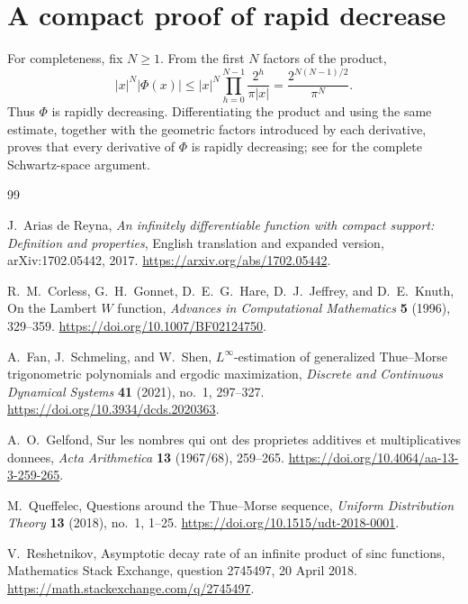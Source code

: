 \documentclass[11pt,oneside]{article}
\theoremstyle{definition}
\theoremstyle{remark}
\newcommand{\PhiF}{\Phi}
\begin{document}
\section{A compact proof of rapid decrease}
\label{app:rapid}

For completeness, fix \(N\ge1\).  From the first \(N\) factors of the product,
\[
 |x|^N|\PhiF(x)|
 \le |x|^N\prod_{h=0}^{N-1}
 \frac{2^h}{\pi|x|}
 =\frac{2^{N(N-1)/2}}{\pi^N}.
\]
Thus \(\PhiF\) is rapidly decreasing.  Differentiating the product and using
the same estimate, together with the geometric factors introduced by each
derivative, proves that every derivative of \(\PhiF\) is rapidly decreasing;
see \cite{arias2017} for the complete Schwartz-space argument.

\begin{thebibliography}{99}

J.~Arias de Reyna,
\newblock \emph{An infinitely differentiable function with compact support:
Definition and properties},
\newblock English translation and expanded version, arXiv:1702.05442, 2017.
\newblock \url{https://arxiv.org/abs/1702.05442}.

R.~M.~Corless, G.~H.~Gonnet, D.~E.~G.~Hare, D.~J.~Jeffrey, and D.~E.~Knuth,
\newblock On the Lambert \(W\) function,
\newblock \emph{Advances in Computational Mathematics} \textbf{5} (1996),
329--359.
\newblock \url{https://doi.org/10.1007/BF02124750}.

A.~Fan, J.~Schmeling, and W.~Shen,
\newblock \(L^\infty\)-estimation of generalized Thue--Morse trigonometric
polynomials and ergodic maximization,
\newblock \emph{Discrete and Continuous Dynamical Systems} \textbf{41}
(2021), no.~1, 297--327.
\newblock \url{https://doi.org/10.3934/dcds.2020363}.

A.~O.~Gelfond,
\newblock Sur les nombres qui ont des proprietes additives et
multiplicatives donnees,
\newblock \emph{Acta Arithmetica} \textbf{13} (1967/68), 259--265.
\newblock \url{https://doi.org/10.4064/aa-13-3-259-265}.

M.~Queffelec,
\newblock Questions around the Thue--Morse sequence,
\newblock \emph{Uniform Distribution Theory} \textbf{13} (2018), no.~1,
1--25.
\newblock \url{https://doi.org/10.1515/udt-2018-0001}.

V.~Reshetnikov,
\newblock Asymptotic decay rate of an infinite product of sinc functions,
\newblock Mathematics Stack Exchange, question 2745497, 20 April 2018.
\newblock \url{https://math.stackexchange.com/q/2745497}.


\end{thebibliography}
\end{document}
